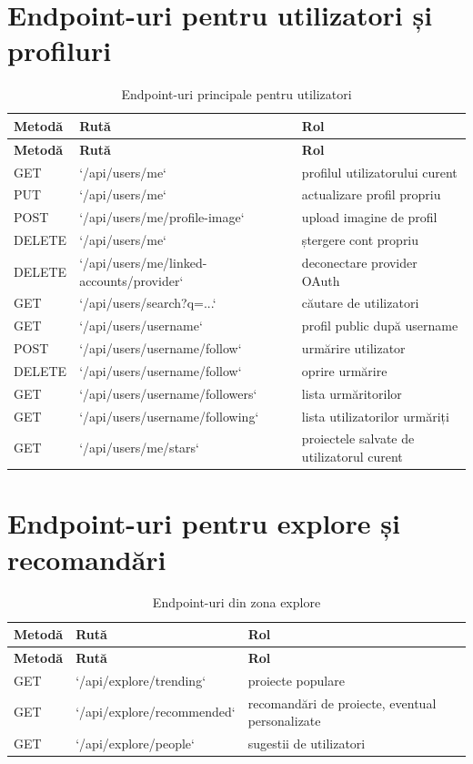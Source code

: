 \section{Endpoint-uri pentru utilizatori și profiluri}

\begin{longtable}{>{\RaggedRight\arraybackslash}p{2cm}>{\RaggedRight\arraybackslash}p{5.7cm}>{\RaggedRight\arraybackslash}p{6.2cm}}
  \caption{Endpoint-uri principale pentru utilizatori} \\
  \toprule
  \textbf{Metodă} & \textbf{Rută} & \textbf{Rol} \\
  \midrule
  \endfirsthead
  \toprule
  \textbf{Metodă} & \textbf{Rută} & \textbf{Rol} \\
  \midrule
  \endhead
  GET & `/api/users/me` & profilul utilizatorului curent \\
  PUT & `/api/users/me` & actualizare profil propriu \\
  POST & `/api/users/me/profile-image` & upload imagine de profil \\
  DELETE & `/api/users/me` & ștergere cont propriu \\
  DELETE & `/api/users/me/linked-accounts/{provider}` & deconectare provider OAuth \\
  GET & `/api/users/search?q=...` & căutare de utilizatori \\
  GET & `/api/users/{username}` & profil public după username \\
  POST & `/api/users/{username}/follow` & urmărire utilizator \\
  DELETE & `/api/users/{username}/follow` & oprire urmărire \\
  GET & `/api/users/{username}/followers` & lista urmăritorilor \\
  GET & `/api/users/{username}/following` & lista utilizatorilor urmăriți \\
  GET & `/api/users/me/stars` & proiectele salvate de utilizatorul curent \\
  \bottomrule
\end{longtable}

\section{Endpoint-uri pentru explore și recomandări}

\begin{longtable}{>{\RaggedRight\arraybackslash}p{2cm}>{\RaggedRight\arraybackslash}p{5.7cm}>{\RaggedRight\arraybackslash}p{6.2cm}}
  \caption{Endpoint-uri din zona explore} \\
  \toprule
  \textbf{Metodă} & \textbf{Rută} & \textbf{Rol} \\
  \midrule
  \endfirsthead
  \toprule
  \textbf{Metodă} & \textbf{Rută} & \textbf{Rol} \\
  \midrule
  \endhead
  GET & `/api/explore/trending` & proiecte populare \\
  GET & `/api/explore/recommended` & recomandări de proiecte, eventual personalizate \\
  GET & `/api/explore/people` & sugestii de utilizatori \\
  \bottomrule
\end{longtable}

